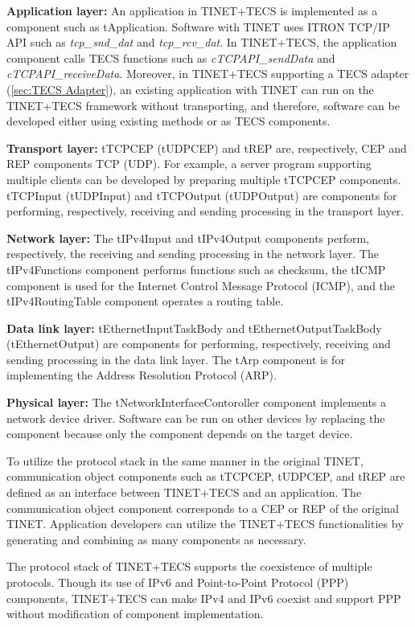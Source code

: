 \documentclass[conference]{IEEEtran/IEEEtran}
\begin{document}
{\bf Application layer:}
An application in TINET+TECS is implemented as a component such as tApplication.
Software with TINET uses ITRON TCP/IP API \cite{url:ITRON_TCP/IP_API_Spec} such as {\it tcp\_snd\_dat} and {\it tcp\_rcv\_dat}.
In TINET+TECS, the application component calls TECS functions such as {\it cTCPAPI\_sendData} and {\it cTCPAPI\_receiveData}.
Moreover, in TINET+TECS supporting a TECS adapter (\ref{sec:TECS Adapter}), an existing application with TINET can run on the TINET+TECS framework without transporting, and therefore, software can be developed either using existing methods or as TECS components.

{\bf Transport layer:}
tTCPCEP (tUDPCEP) and tREP are, respectively, CEP and REP components TCP (UDP).
For example, a server program supporting multiple clients can be developed by preparing multiple tTCPCEP components.
tTCPInput (tUDPInput) and tTCPOutput (tUDPOutput) are components for performing, respectively, receiving and sending processing in the transport layer.

{\bf Network layer:}
The tIPv4Input and tIPv4Output components perform, respectively, the receiving and sending processing in the network layer.
The tIPv4Functions component performs functions such as checksum, the tICMP component is used for the Internet Control Message Protocol (ICMP), and the tIPv4RoutingTable component operates a routing table.

{\bf Data link layer:}
tEthernetInputTaskBody and tEthernetOutputTaskBody (tEthernetOutput) are components for performing, respectively, receiving and sending processing in the data link layer.
The tArp component is for implementing the Address Resolution Protocol (ARP).

{\bf Physical layer:}
The tNetworkInterfaceContoroller component implements a network device driver.
Software can be run on other devices by replacing the component because only the component depends on the target device.

To utilize the protocol stack in the same manner in the original TINET, communication object components such as tTCPCEP, tUDPCEP, and tREP are defined as an interface between TINET+TECS and an application.
The communication object component corresponds to a CEP or REP of the original TINET.
Application developers can utilize the TINET+TECS functionalities by generating and combining as many components as necessary.

The protocol stack of TINET+TECS supports the coexistence of multiple protocols.
Though its use of IPv6 and Point-to-Point Protocol (PPP) components, TINET+TECS can make IPv4 and IPv6 coexist and support PPP without modification of component implementation.
\end{document}
